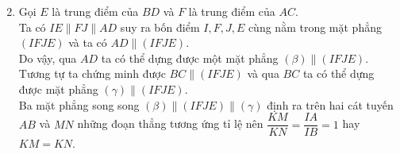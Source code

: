 \begin{bt}
{\begin{enumerate}
			\setcounter{enumi}{1}
			\item Gọi $E$ là trung điểm của $BD$ và $F$ là trung điểm của $AC$. \\
			Ta có $IE\parallel FJ\parallel AD$ suy ra bốn điểm $I,F,J,E$ cùng nằm trong mặt phẳng $(IFJE)$ và ta có $AD\parallel (IFJE)$. \\
			Do vậy, qua $AD$ ta có thể dựng được một mặt phẳng $\left(\beta \right)\parallel (IFJE)$. Tương tự ta chứng minh được $BC\parallel (IFJE)$ và qua $BC$ ta có thể dựng được mặt phẳng $\left(\gamma \right)\parallel (IFJE)$. \\
			Ba mặt phẳng song song $\left(\beta \right)\parallel (IFJE)\parallel \left(\gamma \right)$ định ra trên hai cát tuyến $AB$ và $MN$ những đoạn thẳng tương ứng tỉ lệ nên $\dfrac{KM}{KN}=\dfrac{IA}{IB}=1$ hay $KM=KN$.
		\end{enumerate}
	}
\end{bt}

